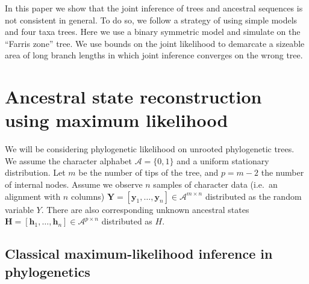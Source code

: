 \documentclass[a4paper]{article}
\newcommand{\alphabet}{\mathcal{A}}
\newcommand{\fullAlignment}{\mathbf{Y}}
\newcommand{\alignmentColumn}{\mathbf{y}}
\newcommand{\alignmentColumnRV}{Y}
\newcommand{\fullAncestralStates}{\mathbf{H}}
\newcommand{\ancestralStateColumn}{\mathbf{h}}
\newcommand{\ancestralStateColumnRV}{H}
\newcommand{\nCols}{n}
\newcommand{\nSiteRows}{m}
\newcommand{\nAncestralStateRows}{p}
\begin{document}
In this paper we show that the joint inference of trees and ancestral sequences is not consistent in general.
To do so, we follow a strategy of using simple models and four taxa trees.
Here we use a binary symmetric model and simulate on the ``Farris zone'' \cite{Siddall1998-hq} tree.
We use bounds on the joint likelihood to demarcate a sizeable area of long branch lengths in which joint inference converges on the wrong tree.

\section{Ancestral state reconstruction using maximum likelihood}

We will be considering phylogenetic likelihood on unrooted phylogenetic trees.
We assume the character alphabet $\alphabet=\{0,1\}$ and a uniform stationary distribution.
Let $\nSiteRows$ be the number of tips of the tree, and $\nAncestralStateRows = \nSiteRows-2$ the number of internal nodes.
Assume we observe $\nCols$ samples of character data (i.e.\ an alignment with $\nCols$ columns) $\fullAlignment=[\alignmentColumn_1,\ldots,\alignmentColumn_\nCols]\in\alphabet^{\nSiteRows\times\nCols}$ distributed as the random variable $\alignmentColumnRV$.
There are also corresponding unknown ancestral states $\fullAncestralStates=[\ancestralStateColumn_1,\ldots,\ancestralStateColumn_\nCols]\in\alphabet^{\nAncestralStateRows\times\nCols}$ distributed as $\ancestralStateColumnRV$.

\subsection{Classical maximum-likelihood inference in phylogenetics}
\end{document}
